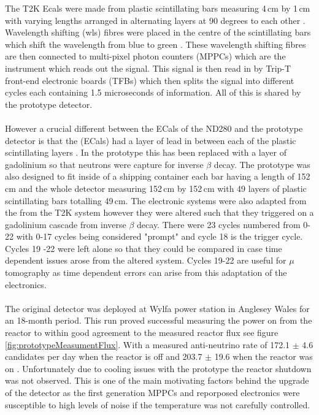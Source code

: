 The T2K Ecals were made from plastic scintillating bars measuring 4\,cm by 1\,cm with varying lengths arranged in alternating layers at 90 degrees to each other \cite{Allan_2013}. Wavelength shifting (wls) fibres were placed in the centre of the scintillating bars which shift the wavelength from blue to green \cite{Allan_2013}. These wavelength shifting fibres are then connected to multi-pixel photon counters (MPPCs) which are the instrument which reads out the signal. This signal is then read in by Trip-T front-end electronic boards (TFBs) which then splits the signal into different cycles each containing 1.5 microseconds of information. All of this is shared by the prototype detector. 
\\\\However a crucial different between the ECals of the ND280 and the prototype detector is that the (ECals) had a layer of lead in between each of the plastic scintillating layers \cite{Allan_2013}. In the prototype this has been replaced with a layer of gadolinium so that neutrons were capture for inverse $\beta$ decay. The prototype was also designed to fit inside of a shipping container each bar having a length of 152\,cm and the whole detector measuring 152\,cm by 152\,cm with 49 layers of plastic scintillating bars totalling 49\,cm. The electronic systems were also adapted from the from the T2K system however they were altered such that they triggered on a gadolinium cascade from inverse $\beta$ decay. There were 23 cycles numbered from 0-22 with 0-17 cycles being considered "prompt" and cycle 18 is the trigger cycle. Cycles 19 -22 were left alone so that they could be compared in case time dependent issues arose from the altered system. Cycles 19-22 are useful for $\mu$ tomography as time dependent errors can arise from this adaptation of the electronics. 
\\\\The original detector was deployed at Wylfa power station in Anglesey Wales for an 18-month period. This run proved successful measuring the power on from the reactor to within good agreement to the measured reactor flux see figure \ref{fig:prototypeMeasumentFlux}. With a measured anti-neutrino rate of 172.1 $\pm$ 4.6 candidates per day when the reactor is off and 203.7 $\pm$ 19.6 when the reactor was on \cite{Carroll_2018}. Unfortunately due to cooling issues with the prototype the reactor shutdown was not observed. This is one of the main motivating factors behind the upgrade of the detector as the first generation MPPCs and reporposed electronics were susceptible to high levels of noise if the temperature was not carefully controlled. 
